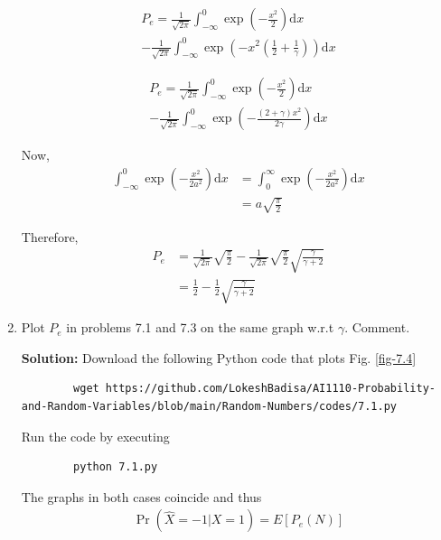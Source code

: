 \documentclass[journal,12pt,twocolumn]{IEEEtran}
\newcommand{\solution}{\noindent \textbf{Solution: }}
\providecommand{\pr}[1]{\ensuremath{\Pr\left(#1\right)}}
\providecommand{\brak}[1]{\ensuremath{\left(#1\right)}}
\providecommand{\mean}[1]{E\left[ #1 \right]}
\providecommand{\der}[1]{\mathrm{d} #1}
\numberwithin{equation}{section}
\renewcommand\thesection{\arabic{section}}
\begin{document}
\begin{enumerate}[label=\thesection.\arabic*,ref=\thesection.\theenumi]
	\begin{multline}
		P_e = \frac{1}{\sqrt{2\pi}} \int_{-\infty}^{0} \exp\brak{-\frac{x^2}{2}} \der{x} \\
		- \frac{1}{\sqrt{2\pi}} \int_{-\infty}^{0}  \exp\brak{-x^2\brak{\frac{1}{2} + \frac{1}{\gamma}}} \der{x}
	\end{multline}
	
	\begin{multline}
		P_e = \frac{1}{\sqrt{2\pi}} \int_{-\infty}^{0} \exp\brak{-\frac{x^2}{2}} \der{x} \\
		- \frac{1}{\sqrt{2\pi}} \int_{-\infty}^{0}  \exp\brak{-\frac{(2+\gamma) x^2}{2\gamma} } \der{x}
	\end{multline}
	
	Now,
	\begin{align}
		\int_{-\infty}^{0} \exp\brak{-\frac{x^2}{2a^2}} \der{x} &= \int_{0}^{\infty} \exp\brak{-\frac{x^2}{2a^2}} \der{x} \\
		 &= a \sqrt{\frac{\pi}{2}}
	\end{align}
	
	Therefore,
	\begin{align}
		P_e &= \frac{1}{\sqrt{2\pi}} \sqrt{\frac{\pi}{2}} - \frac{1}{\sqrt{2\pi}} \sqrt{\frac{\pi}{2}} \sqrt{\frac{\gamma}{\gamma+2}} \\
		&= \frac{1}{2} - \frac{1}{2} \sqrt{\frac{\gamma}{\gamma+2}}
	\end{align}
	
	\item Plot $P_e$ in problems 7.1 and 7.3 on the same graph w.r.t $\gamma$.  Comment.
	
	\solution Download the following Python code that plots Fig. \ref{fig-7.4} 
	\begin{lstlisting}
		wget https://github.com/LokeshBadisa/AI1110-Probability-and-Random-Variables/blob/main/Random-Numbers/codes/7.1.py
	\end{lstlisting}
	Run the code by executing
	\begin{lstlisting}
		python 7.1.py
	\end{lstlisting}
	
	The graphs in both cases coincide and thus
	\begin{align}
		\pr{\hat{X} = -1|X = 1} = \mean{P_e(N)}
	\end{align}
	

\end{enumerate}
\end{document}

